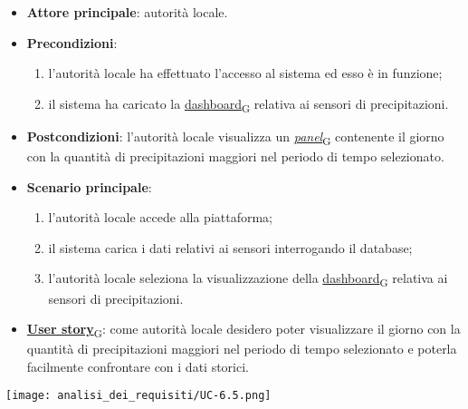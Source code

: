 \begin{itemize}
	\item \textbf{Attore principale}: autorità locale.
	\item \textbf{Precondizioni}:
	      \begin{enumerate}
		      \item l'autorità locale ha effettuato l'accesso al sistema ed esso è in funzione;
		      \item il sistema ha caricato la \href{https://7last.github.io/docs/pb/documentazione-interna/glossario\#dashboard}{dashboard\textsubscript{G}} relativa ai sensori di precipitazioni.
	      \end{enumerate}
	\item \textbf{Postcondizioni}: l'autorità locale visualizza un \href{https://7last.github.io/docs/pb/documentazione-interna/glossario\#panel}{\textit{panel}\textsubscript{G}} contenente il giorno con la quantità di precipitazioni maggiori nel periodo di tempo selezionato.
	\item \textbf{Scenario principale}:
	      \begin{enumerate}
		      \item l'autorità locale accede alla piattaforma;
		      \item il sistema carica i dati relativi ai sensori interrogando il database;
		      \item l'autorità locale seleziona la visualizzazione della \href{https://7last.github.io/docs/pb/documentazione-interna/glossario\#dashboard}{dashboard\textsubscript{G}} relativa ai sensori di precipitazioni.
	      \end{enumerate}
	\item \href{https://7last.github.io/docs/pb/documentazione-interna/glossario\#user-story}{\textbf{User story}\textsubscript{G}}:
	      come autorità locale desidero poter visualizzare il giorno con la quantità di precipitazioni maggiori nel periodo di tempo selezionato
	      e poterla facilmente confrontare con i dati storici.
\end{itemize}
\begin{center}
	\texttt{[image: analisi\_dei\_requisiti/UC-6.5.png]}
\end{center}


